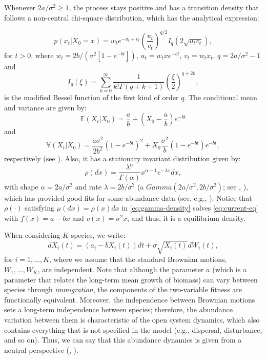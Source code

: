 \documentclass[12pt]{article}
\begin{document}
Whenever  $2a/\sigma^2\geq1$, the process stays positive and has a transition density that follows a non-central chi-square distribution, which has the analytical expression:

\begin{equation}\label{eq:cir-trans}
p(x_t|X_0=x)=w_te^{-u_t+v_t}\left(\frac{u_t}{v_t}\right)^{q/2}I_q(2\sqrt{u_tv_t}),
\end{equation}
for $t>0$, where $w_t=2b/\left(\sigma^2\left[1-e^{-bt}\right]\right)$, $u_t=w_txe^{-bt}$, $v_t=w_tx_t$, $q=2a/\sigma^2-1$ and $$I_q(\xi)=\sum_{k=0}^{\infty}\frac{1}{k!\Gamma(q+k+1)}\left(\frac{\xi}{2}\right)^{q+2k},$$ is the modified Bessel function of the first kind of order $q$.
The conditional mean and variance are given by:
\begin{equation}\label{eq:cir-mean-cond}
\mathbb{E}(X_t|X_0)=\frac{a}{b}+\left(X_0-\frac{a}{b}\right)e^{-bt}
\end{equation}
and
\begin{equation}\label{eq:cir-var-cond}
\mathbb{V}(X_t|X_0)=\frac{a\sigma^2}{2b^2}\left(1-e^{-bt}\right)^2+X_0\frac{\sigma^2}{b}\left(1-e^{-bt}\right)e^{-bt},
\end{equation}
respectively (see \citep{dyrting2004evaluating}). Also, it has a stationary invariant distribution given by:
\begin{equation}\label{eq:gamma-density}
\rho(dx)=\frac{\lambda^{\alpha}}{\Gamma(\alpha)}x^{\alpha-1}e^{-\lambda x}dx,
\end{equation}
with shape $\alpha=2a/\sigma^2$ and rate $\lambda=2b/\sigma^2$  (a $Gamma(2a/\sigma^2,2b/\sigma^2)$; see \citep{ditlevsen2012introduction}, \citep{leonenko2012high}), which has provided good fits for some abundance data (see, e.g., \citep{dennis1984gamma,schmidt1985species, engen1996population, diserud2000general,lande2003stochastic,azaele2006dynamical}). Notice that $\rho(\cdot)$ satisfying $\mu(dx)=\rho(x)dx$ in \eqref{eq:gamma-density} solves \eqref{eq:current-eq} with $f(x)=a-bx$ and $v(x)=\sigma^2x$, and thus, it is a equilibrium density.


When considering $K$ species, we write:
\begin{equation}\label{eq:CIR-several}
dX_i(t)=(a_i-bX_i(t))dt+\sigma\sqrt{X_i(t)}dW_i(t),
\end{equation}
for $i=1, ..., K$, where we assume that the standard Brownian motions, $W_1, ..., W_K$, are independent. 
Note that although the parameter $a$ (which is a parameter that relates the long-term mean growth of biomass) can vary between species through \textit{immigration}, the components of the two-variable fitness are functionally equivalent. Moreover, the independence between Brownian motions sets a long-term  independence between species; therefore, the abundance
variation between them is characteristic of the open system dynamics, which also contains everything that is not specified in the model  (e.g., dispersal, disturbance, and so on). Thus, we can say that this abundance dynamics is given from a neutral perspective (\citep{hubbell2005neutral}, \citep{hubbell2011unified}). 
\end{document}
